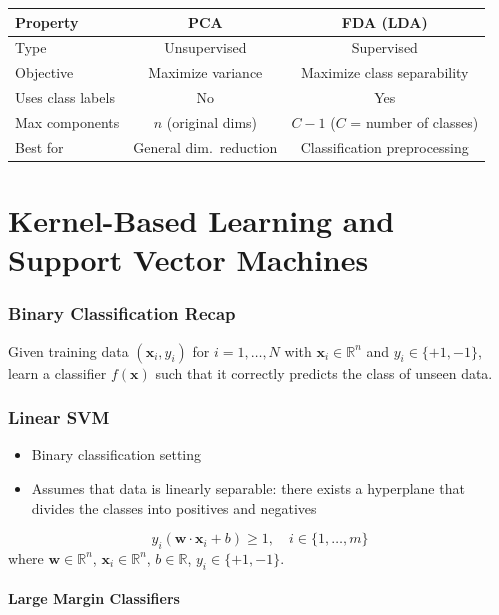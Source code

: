 \documentclass[11pt,a4paper]{article}
\theoremstyle{definition}
\theoremstyle{plain}
\theoremstyle{remark}
\newcommand{\R}{\mathbb{R}}
\begin{document}
\begin{center}
\begin{tabular}{|l|c|c|}
\hline
\textbf{Property} & \textbf{PCA} & \textbf{FDA (LDA)} \\
\hline
Type & Unsupervised & Supervised \\
\hline
Objective & Maximize variance & Maximize class separability \\
\hline
Uses class labels & No & Yes \\
\hline
Max components & $n$ (original dims) & $C - 1$ ($C$ = number of classes) \\
\hline
Best for & General dim.\ reduction & Classification preprocessing \\
\hline
\end{tabular}
\end{center}

\newpage

\part{Kernel-Based Learning and Support Vector Machines}

\section{Binary Classification Recap}

Given training data $(\mathbf{x}_i, y_i)$ for $i = 1, \ldots, N$ with $\mathbf{x}_i \in \R^n$ and $y_i \in \{+1, -1\}$, learn a classifier $f(\mathbf{x})$ such that it correctly predicts the class of unseen data.

\section{Linear SVM}

\begin{itemize}
    \item Binary classification setting
    \item Assumes that data is linearly separable: there exists a hyperplane that divides the classes into positives and negatives
\end{itemize}
\[
y_i(\mathbf{w} \cdot \mathbf{x}_i + b) \geq 1, \quad i \in \{1, \ldots, m\}
\]
where $\mathbf{w} \in \R^n$, $\mathbf{x}_i \in \R^n$, $b \in \R$, $y_i \in \{+1, -1\}$.

\subsection{Large Margin Classifiers}
\end{document}
